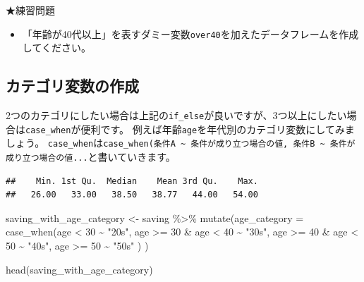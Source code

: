 \documentclass[
]{book}
\newenvironment{Shaded}{\begin{snugshade}}{\end{snugshade}}
\newcommand{\AttributeTok}[1]{\textcolor[rgb]{0.77,0.63,0.00}{#1}}
\newcommand{\CommentTok}[1]{\textcolor[rgb]{0.56,0.35,0.01}{\textit{#1}}}
\newcommand{\DecValTok}[1]{\textcolor[rgb]{0.00,0.00,0.81}{#1}}
\newcommand{\FunctionTok}[1]{\textcolor[rgb]{0.00,0.00,0.00}{#1}}
\newcommand{\NormalTok}[1]{#1}
\newcommand{\OtherTok}[1]{\textcolor[rgb]{0.56,0.35,0.01}{#1}}
\newcommand{\SpecialCharTok}[1]{\textcolor[rgb]{0.00,0.00,0.00}{#1}}
\newcommand{\StringTok}[1]{\textcolor[rgb]{0.31,0.60,0.02}{#1}}
\providecommand{\tightlist}{%
  \setlength{\itemsep}{0pt}\setlength{\parskip}{0pt}}
\begin{document}
★練習問題

\begin{itemize}
\tightlist
\item
  「年齢が40代以上」を表すダミー変数\texttt{over40}を加えたデータフレームを作成してください。
\end{itemize}

\hypertarget{ux30abux30c6ux30b4ux30eaux5909ux6570ux306eux4f5cux6210}{%
\subsection{カテゴリ変数の作成}\label{ux30abux30c6ux30b4ux30eaux5909ux6570ux306eux4f5cux6210}}

2つのカテゴリにしたい場合は上記の\texttt{if\_else}が良いですが、3つ以上にしたい場合は\texttt{case\_when}が便利です。
例えば年齢\texttt{age}を年代別のカテゴリ変数にしてみましょう。
\texttt{case\_when}は\texttt{case\_when(条件A\ \textasciitilde{}\ 条件が成り立つ場合の値,\ 条件B\ \textasciitilde{}\ 条件が成り立つ場合の値...}と書いていきます。

\begin{Shaded}
\end{Shaded}

\begin{verbatim}
##    Min. 1st Qu.  Median    Mean 3rd Qu.    Max. 
##   26.00   33.00   38.50   38.77   44.00   54.00
\end{verbatim}

\begin{Shaded}
\begin{Highlighting}[]
\NormalTok{saving\_with\_age\_category }\OtherTok{\textless{}{-}}
\NormalTok{  saving }\SpecialCharTok{\%\textgreater{}\%}
    \FunctionTok{mutate}\NormalTok{(}\AttributeTok{age\_category =} \FunctionTok{case\_when}\NormalTok{(age }\SpecialCharTok{\textless{}} \DecValTok{30} \SpecialCharTok{\textasciitilde{}} \StringTok{"20s"}\NormalTok{,}
\NormalTok{                                    age }\SpecialCharTok{\textgreater{}=} \DecValTok{30} \SpecialCharTok{\&}\NormalTok{ age }\SpecialCharTok{\textless{}} \DecValTok{40} \SpecialCharTok{\textasciitilde{}} \StringTok{"30s"}\NormalTok{,}
\NormalTok{                                    age }\SpecialCharTok{\textgreater{}=} \DecValTok{40} \SpecialCharTok{\&}\NormalTok{ age }\SpecialCharTok{\textless{}} \DecValTok{50} \SpecialCharTok{\textasciitilde{}} \StringTok{"40s"}\NormalTok{,}
\NormalTok{                                    age }\SpecialCharTok{\textgreater{}=} \DecValTok{50} \SpecialCharTok{\textasciitilde{}} \StringTok{"50s"}
\NormalTok{                                    )}
\NormalTok{          )}

\FunctionTok{head}\NormalTok{(saving\_with\_age\_category)}
\end{Highlighting}
\end{Shaded}
\end{document}
